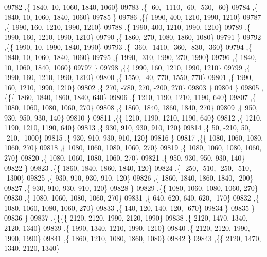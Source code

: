 \begin{DoxyCode}
09782     ,\{  1840,    10,  1060,  1840,  1060\}
09783     ,\{   -60, -1110,   -60,  -530,   -60\}
09784     ,\{  1840,    10,  1060,  1840,  1060\}
09785     \}
09786    ,\{\{  1990,   400,  1210,  1990,  1210\}
09787     ,\{  1990,   160,  1210,  1990,  1210\}
09788     ,\{  1990,   400,  1210,  1990,  1210\}
09789     ,\{  1990,   160,  1210,  1990,  1210\}
09790     ,\{  1860,   270,  1080,  1860,  1080\}
09791     \}
09792    ,\{\{  1990,    10,  1990,  1840,  1990\}
09793     ,\{  -360, -1410,  -360,  -830,  -360\}
09794     ,\{  1840,    10,  1060,  1840,  1060\}
09795     ,\{  1990,  -310,  1990,   270,  1990\}
09796     ,\{  1840,    10,  1060,  1840,  1060\}
09797     \}
09798    ,\{\{  1990,   160,  1210,  1990,  1210\}
09799     ,\{  1990,   160,  1210,  1990,  1210\}
09800     ,\{  1550,   -40,   770,  1550,   770\}
09801     ,\{  1990,   160,  1210,  1990,  1210\}
09802     ,\{   270,  -780,   270,  -200,   270\}
09803     \}
09804    \}
09805   ,\{\{\{  1860,  1840,  1860,  1840,   640\}
09806     ,\{  1210,  1190,  1210,  1190,   640\}
09807     ,\{  1080,  1060,  1080,  1060,   270\}
09808     ,\{  1860,  1840,  1860,  1840,   270\}
09809     ,\{   950,   930,   950,   930,   140\}
09810     \}
09811    ,\{\{  1210,  1190,  1210,  1190,   640\}
09812     ,\{  1210,  1190,  1210,  1190,   640\}
09813     ,\{   930,   910,   930,   910,   120\}
09814     ,\{    50,  -210,    50,  -210, -1000\}
09815     ,\{   930,   910,   930,   910,   120\}
09816     \}
09817    ,\{\{  1080,  1060,  1080,  1060,   270\}
09818     ,\{  1080,  1060,  1080,  1060,   270\}
09819     ,\{  1080,  1060,  1080,  1060,   270\}
09820     ,\{  1080,  1060,  1080,  1060,   270\}
09821     ,\{   950,   930,   950,   930,   140\}
09822     \}
09823    ,\{\{  1860,  1840,  1860,  1840,   120\}
09824     ,\{  -250,  -510,  -250,  -510, -1300\}
09825     ,\{   930,   910,   930,   910,   120\}
09826     ,\{  1860,  1840,  1860,  1840,  -200\}
09827     ,\{   930,   910,   930,   910,   120\}
09828     \}
09829    ,\{\{  1080,  1060,  1080,  1060,   270\}
09830     ,\{  1080,  1060,  1080,  1060,   270\}
09831     ,\{   640,   620,   640,   620,  -170\}
09832     ,\{  1080,  1060,  1080,  1060,   270\}
09833     ,\{   140,   120,   140,   120,  -670\}
09834     \}
09835    \}
09836   \}
09837  ,\{\{\{\{  2120,  2120,  1990,  2120,  1990\}
09838     ,\{  2120,  1470,  1340,  2120,  1340\}
09839     ,\{  1990,  1340,  1210,  1990,  1210\}
09840     ,\{  2120,  2120,  1990,  1990,  1990\}
09841     ,\{  1860,  1210,  1080,  1860,  1080\}
09842     \}
09843    ,\{\{  2120,  1470,  1340,  2120,  1340\}

\end{DoxyCode}
